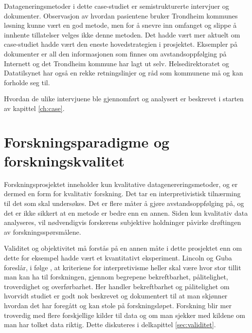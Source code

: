 Datageneringsmetoder i dette case-studiet er semistrukturerte intervjuer og dokumenter. Observasjon av hvordan pasientene bruker Trondheim kommunes løsning
kunne vært en god metode, men for å snevre inn omfanget og slippe å innhente tillatelser velges ikke denne metoden. Det hadde vært mer
aktuelt om case-studiet hadde vært den eneste hovedstrategien i prosjektet. Eksempler på dokumenter er all den informasjonen som finnes om
avstandsoppfølging på Internett og det Trondheim kommune har lagt ut selv. Helsedirektoratet og Datatilsynet
har også en rekke retningslinjer og råd som kommunene må og kan forholde seg til.

Hvordan de ulike intervjuene ble gjennomført og analysert er beskrevet i starten av kapittel \ref{ch:case}.

\section{Forskningsparadigme og forskningskvalitet}
Forskningsprosjektet inneholder kun kvalitative datagenereringsmetoder, og er dermed en form for kvalitativ forskning.
Det tar en interpretivistisk tilnærming til det som skal undersøkes. Det er flere måter å gjøre avstandsoppfølging på,
og det er ikke sikkert at en metode er bedre enn en annen.
Siden kun kvalitativ data analyseres, vil nødvendigvis forskerens subjektive holdninger påvirke drøftingen av forskningsspørsmålene.

Validitet og objektivitet må forstås på en annen måte i dette prosjektet enn om dette for eksempel hadde vært et
kvantitativt eksperiment. Lincoln og Guba foreslår, i følge \citet{oates},
at kriteriene for interpretivisme
heller skal være hvor stor tillit man kan ha til forskningen, gjennom begrepene bekreftbarhet, pålitelighet, troverdighet og overførbarhet.
Her handler bekreftbarhet og pålitelighet om hvorvidt studiet er godt nok beskrevet og dokumentert til at man skjønner hvordan det har
foregått og kan stole
på forskningsløpet. Forskning blir mer troverdig med flere forskjellige kilder til data og om man sjekker med kildene om man har
tolket data riktig. Dette diskuteres i delkapittel \ref{sec:validitet}.
